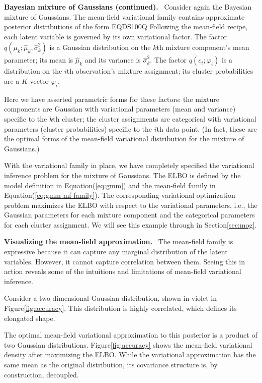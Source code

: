 \documentclass{article}
\DeclareRobustCommand{\parhead}[1]{\textbf{#1}~}
\begin{document}
\parhead{Bayesian mixture of Gaussians (continued).}  Consider again
the Bayesian mixture of Gaussians. The mean-field variational family
contains approximate posterior distributions of the form
EQDS100Q
Following the mean-field recipe, each latent variable is governed by
its own variational factor.  The factor
$q(\mu_k; \hat{\mu}_k, \hat{\sigma}^2_k)$ is a Gaussian distribution
on the $k$th mixture component's mean parameter; its mean is
$\hat{\mu}_k$ and its variance is $\hat{\sigma}^2_k$.  The factor
$q(c_i; \varphi_i)$ is a distribution on the $i$th observation's
mixture assignment; its cluster probabilities are a $K$-vector
$\varphi_i$.

Here we have asserted parametric forms for these factors: the mixture
components are Gaussian with variational parameters (mean and
variance) specific to the $k$th cluster; the cluster assignments are
categorical with variational parameters (cluster probabilities)
specific to the $i$th data point.  (In fact, these are the optimal
forms of the mean-field variational distribution for the mixture of
Gaussians.)

With the variational family in place, we have completely specified the
variational inference problem for the mixture of Gaussians.  The
\gls{ELBO} is defined by the model definition in Equation\nobreakspace \textup {(\ref {eq:gmm})} and the
mean-field family in Equation\nobreakspace \textup {(\ref {eq:gmm-mf-family})}.  The corresponding
variational optimization problem maximizes the \gls{ELBO} with respect
to the variational parameters, i.e., the Gaussian parameters for each
mixture component and the categorical parameters for each cluster
assignment.  We will see this example through in Section\nobreakspace \ref {sec:mog}.

\parhead{Visualizing the mean-field approximation.}  The mean-field family is
expressive because it can capture any marginal distribution of the
latent variables.  However, it cannot capture correlation between
them.  Seeing this in action reveals some of the intuitions and
limitations of mean-field variational inference.

Consider a two dimensional Gaussian distribution, shown in violet in
Figure\nobreakspace \ref {fig:accuracy}. This distribution is highly correlated, which
defines its elongated shape.

The optimal mean-field variational approximation to this posterior is
a product of two Gaussian distributions. Figure\nobreakspace \ref {fig:accuracy} shows the
mean-field variational density after maximizing the \gls{ELBO}. While
the variational approximation has the same mean as the original
distribution, its covariance structure is, by construction, decoupled.
\end{document}
